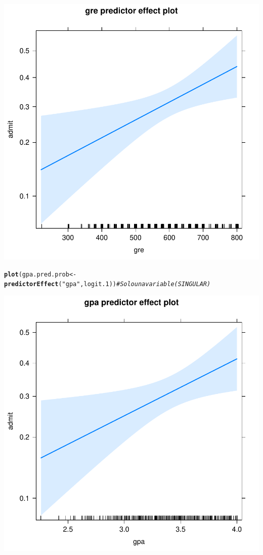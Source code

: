 \documentclass[onesided]{article}\usepackage[]{graphicx}\usepackage[]{color}
\makeatletter
\def\maxwidth{ %
  \ifdim\Gin@nat@width>\linewidth
    \linewidth
  \else
    \Gin@nat@width
  \fi
}
\newcommand{\hlstr}[1]{\textcolor[rgb]{0.192,0.494,0.8}{#1}}%
\newcommand{\hlcom}[1]{\textcolor[rgb]{0.678,0.584,0.686}{\textit{#1}}}%
\newcommand{\hlstd}[1]{\textcolor[rgb]{0.345,0.345,0.345}{#1}}%
\newcommand{\hlkwb}[1]{\textcolor[rgb]{0.69,0.353,0.396}{#1}}%
\newcommand{\hlkwd}[1]{\textcolor[rgb]{0.737,0.353,0.396}{\textbf{#1}}}%
\newenvironment{kframe}{%
 \def\at@end@of@kframe{}%
 \ifinner\ifhmode%
  \def\at@end@of@kframe{\end{minipage}}%
  \begin{minipage}{\columnwidth}%
 \fi\fi%
 \def\FrameCommand##1{\hskip\@totalleftmargin \hskip-\fboxsep
 \colorbox{shadecolor}{##1}\hskip-\fboxsep
     \hskip-\linewidth \hskip-\@totalleftmargin \hskip\columnwidth}%
 \MakeFramed {\advance\hsize-\width
   \@totalleftmargin\z@ \linewidth\hsize
   \@setminipage}}%
 {\par\unskip\endMakeFramed%
 \at@end@of@kframe}
\newenvironment{knitrout}{}{} %
\makeatother
\begin{document}
\begin{knitrout}
{\centering \includegraphics[width=\maxwidth]{figure/predict:2-2} 

}


\begin{kframe}\begin{alltt}
\hlkwd{plot}\hlstd{(gpa.pred.prob} \hlkwb{<-} \hlkwd{predictorEffect}\hlstd{(}\hlstr{"gpa"}\hlstd{, logit.1))} \hlcom{# Solo una variable (SINGULAR)}
\end{alltt}
\end{kframe}

{\centering \includegraphics[width=\maxwidth]{figure/predict:2-3} 

}



\end{knitrout}
\end{document}
